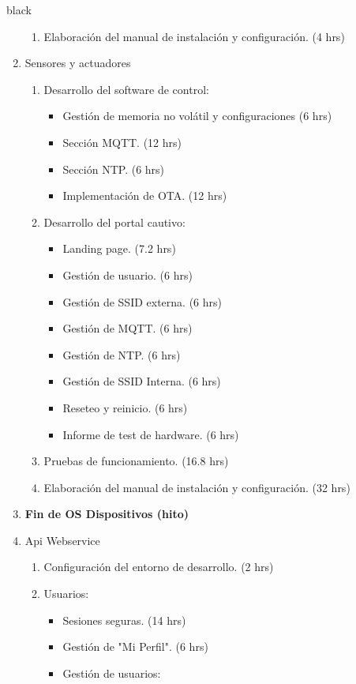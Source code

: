 \documentclass[11pt]{charter}
\begin{document}
\begin{consigna}{black}
\begin{enumerate}
\begin{enumerate}
		\item Elaboración del manual de instalación y configuración. (4 hrs)
	\end{enumerate}
\item Sensores y actuadores
	\begin{enumerate}
		\item Desarrollo del software de control:
		\begin{itemize}
			\item Gestión de memoria no volátil y configuraciones (6 hrs)
			\item Sección MQTT. (12 hrs)
			\item Sección NTP. (6 hrs)
			\item Implementación de OTA. (12 hrs)
		\end{itemize}
		\item Desarrollo del portal cautivo:
		\begin{itemize}
			\item Landing page. (7.2 hrs)
			\item Gestión de usuario. (6 hrs)
			\item Gestión de SSID externa. (6 hrs)
			\item Gestión de MQTT. (6 hrs)
			\item Gestión de NTP. (6 hrs)
			\item Gestión de SSID Interna. (6 hrs)
			\item Reseteo y reinicio. (6 hrs)
			\item Informe de test de hardware. (6 hrs)
		\end{itemize}
		\item Pruebas de funcionamiento. (16.8 hrs)
		\item Elaboración del manual de instalación y configuración. (32 hrs)
	\end{enumerate}
\item \textbf{Fin de OS Dispositivos (hito)}
\item Api Webservice
	\begin{enumerate}
		\item Configuración del entorno de desarrollo. (2 hrs)
		\item Usuarios:
			\begin{itemize}
				\item Sesiones seguras. (14 hrs)
				\item Gestión de "Mi Perfil". (6 hrs)
				\item Gestión de usuarios:
				\begin{itemize}

\end{itemize}
\end{itemize}
\end{enumerate}
\end{enumerate}
\end{consigna}
\end{document}
